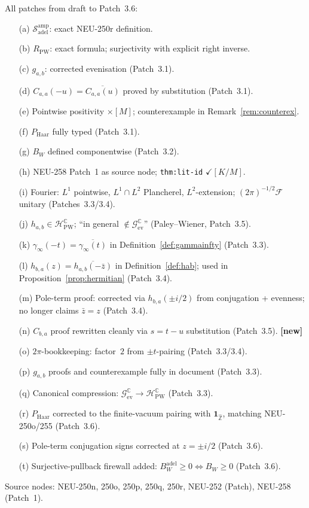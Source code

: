\documentclass[11pt,a4paper]{amsart}
\begin{document}
\medskip
\noindent All patches from draft to Patch~3.6:
\begin{enumerate}
\item[(a)] $\mathcal{S}_{\mathrm{adel}}^{\mathrm{amp}}$: exact NEU-250r definition.
\item[(b)] $R_{\mathrm{PW}}$: exact formula; surjectivity with explicit right inverse.
\item[(c)] $g_{a,b}$: corrected evenisation (Patch~3.1).
\item[(d)] $C_{a,a}(-u)=\overline{C_{a,a}(u)}$ proved by substitution (Patch~3.1).
\item[(e)] Pointwise positivity $\times[M]$; counterexample in Remark~\ref{rem:counterex}.
\item[(f)] $P_{\mathrm{Haar}}$ fully typed (Patch~3.1).
\item[(g)] $B_W$ defined componentwise (Patch~3.2).
\item[(h)] NEU-258 Patch~1 as source node; \texttt{thm:lit-id} $\checkmark[K/M]$.
\item[(i)] Fourier: $L^1$ pointwise, $L^1\cap L^2$ Plancherel,
  $L^2$-extension; $(2\pi)^{-1/2}\mathcal{F}$ unitary (Patches~3.3/3.4).
\item[(j)] $h_{a,b}\in\mathcal{H}_{\mathrm{PW}}^{\mathbb{C}}$; ``in general
  $\notin\mathcal{G}_{\mathrm{ev}}^{\mathbb{C}}$'' (Paley--Wiener, Patch~3.5).
\item[(k)] $\gamma_\infty(-t)=\overline{\gamma_\infty(t)}$ in
  Definition~\ref{def:gammainfty} (Patch~3.3).
\item[(l)] $h_{b,a}(z)=\overline{h_{a,b}(-\bar z)}$ in Definition~\ref{def:hab};
  used in Proposition~\ref{prop:hermitian} (Patch~3.4).
\item[(m)] Pole-term proof: corrected via $h_{b,a}(\pm i/2)$ from
  conjugation + evenness; no longer claims $\bar z=z$ (Patch~3.4).
\item[(n)] $C_{b,a}$ proof rewritten cleanly via $s=t-u$
  substitution (Patch~3.5). \textbf{[new]}
\item[(o)] $2\pi$-bookkeeping: factor~$2$ from $\pm t$-pairing (Patch~3.3/3.4).
\item[(p)] $g_{a,b}$ proofs and counterexample fully in document (Patch~3.3).
\item[(q)] Canonical compression: $\mathcal{G}_{\mathrm{ev}}^{\mathbb{C}}
  \to\mathcal{H}_{\mathrm{PW}}^{\mathbb{C}}$ (Patch~3.3).
\item[(r)] $P_{\mathrm{Haar}}$ corrected to the finite-vacuum pairing
  with $\mathbf{1}_{\widehat{\mathbb Z}}$, matching NEU-250o/255 (Patch~3.6).
\item[(s)] Pole-term conjugation signs corrected at $z=\pm i/2$ (Patch~3.6).
\item[(t)] Surjective-pullback firewall added:
  $B_W^{\mathrm{adel}}\ge0\Longleftrightarrow B_W\ge0$ (Patch~3.6).
\end{enumerate}

\medskip
\noindent Source nodes: NEU-250n, 250o, 250p, 250q, 250r,
NEU-252 (Patch), NEU-258 (Patch~1).
\end{document}
